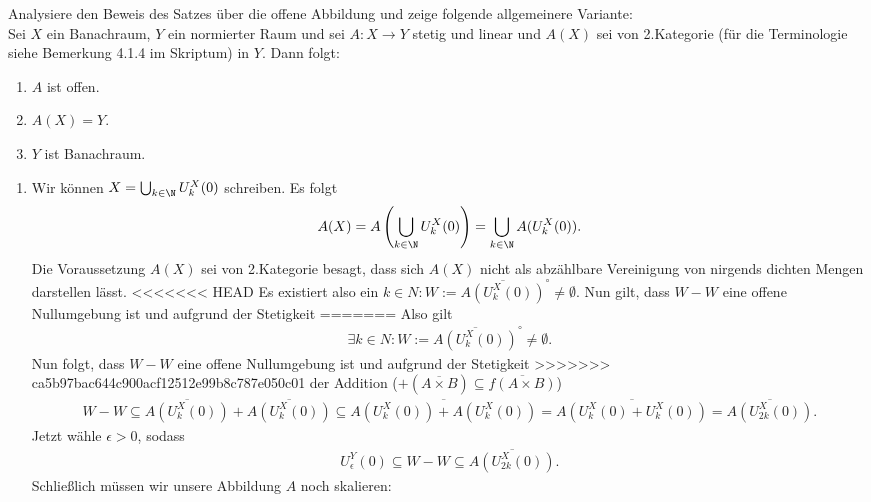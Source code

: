 \begin{exercise}
Analysiere den Beweis des Satzes über die offene Abbildung und zeige folgende
allgemeinere Variante: \\
Sei $X$ ein Banachraum, $Y$ ein normierter Raum und sei $A: X \rightarrow Y$ stetig
und linear und $A(X)$ sei von 2.Kategorie (für die Terminologie siehe Bemerkung
4.1.4 im Skriptum) in $Y$. Dann folgt:
\begin{enumerate}[label = (\roman*)]
  \item $A$ ist offen.
  \item $A(X) = Y$.
  \item $Y$ ist Banachraum.
\end{enumerate}
\end{exercise}
\begin{solution}
\begin{enumerate}[label = (\roman*)]
  \item
  Wir können $X = \bigcup_{k \in \N} U_k^X(0)$ schreiben. Es folgt
  \begin{align*}
    A(X) = A\left(\bigcup_{k \in \N} U_k^X(0)\right)
    = \bigcup_{k \in \N}A(U_k^X(0)).
  \end{align*}
  Die Voraussetzung $A(X)$ sei von 2.Kategorie besagt, dass sich $A(X)$
  nicht als abzählbare Vereinigung von nirgends dichten Mengen darstellen lässt.
<<<<<<< HEAD
  Es existiert also ein $k \in N: W := \overline{A(U_k^X(0))}^{\circ} \neq \emptyset$.
  Nun gilt, dass $W - W$ eine offene Nullumgebung ist und aufgrund der Stetigkeit
=======
  Also gilt
  \begin{align*}
    \exists k \in N: W := \overline{A(U_k^X(0))}^{\circ} \neq \emptyset.
  \end{align*}
  Nun folgt, dass $W - W$ eine offene Nullumgebung ist und aufgrund der Stetigkeit
>>>>>>> ca5b97bac644c900acf12512e99b8c787e050c01
  der Addition ($+(\overline{A \times B}) \subseteq \overline{f(A \times B)}$)
  \begin{align*}
    W - W \subseteq \overline{A(U_k^X(0))} + \overline{A(U_k^X(0))}
    \subseteq \overline{A(U_k^X(0)) + A(U_k^X(0))}
    = \overline{A(U_k^X(0) + U_k^X(0))}
    = \overline{A(U_{2k}^X(0))}.
  \end{align*}
  Jetzt wähle $\epsilon > 0$, sodass
  \begin{align*}
    U_{\epsilon}^Y(0) \subseteq W - W \subseteq \overline{A(U_{2k}^X(0))}.
  \end{align*}
  Schließlich müssen wir unsere Abbildung $A$ noch skalieren:
  \begin{align*}

\end{align*}
\end{enumerate}
\end{solution}
